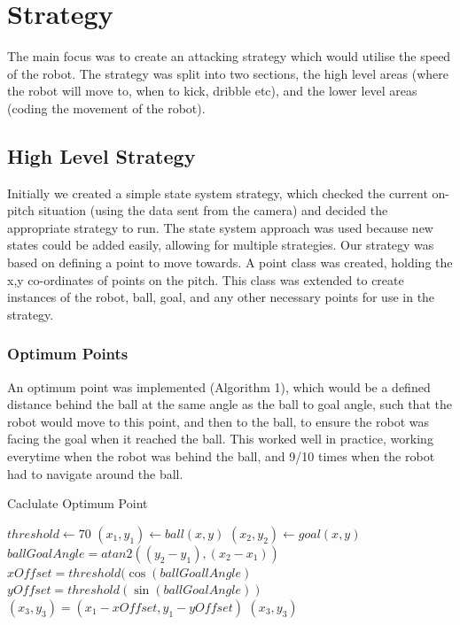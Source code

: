 \section{Strategy}

The main focus was to create an attacking strategy which would utilise the speed of the robot. The strategy was split into two sections, the high level areas (where the robot will move to, when to kick, dribble etc), and the lower level areas (coding the movement of the robot).

\subsection{High Level Strategy}
Initially we created a simple state system strategy, which checked the current on-pitch situation (using the data sent from the camera) and decided the appropriate strategy to run. The state system approach was used because new states could be added easily, allowing for multiple strategies.
Our strategy was based on defining a point to move towards. A point class was created, holding the x,y co-ordinates of points on the pitch. This class was extended to create instances of the robot, ball, goal, and any other necessary points for use in the strategy.\linebreak

\subsubsection{Optimum Points}
An optimum point was implemented (Algorithm 1), which would be a defined distance behind the ball at the same angle as the ball to goal angle, such that the robot would move to this point, and then to the ball, to ensure the robot was facing the goal when it reached the ball. This worked well in practice, working everytime when the robot was behind the ball, and 9/10 times when the robot had to navigate around the ball.\linebreak

\begin{algorithm}
\caption{Caclulate Optimum Point}
\label{optimumPoint}
\begin{algorithmic}[1]
\STATE $threshold \gets 70$
\STATE $(x_{1}, y_{1}) \gets ball (x, y)$
\STATE $(x_{2}, y_{2}) \gets goal (x, y)$
\STATE $ballGoalAngle = atan2( (y_{2} - y_{1}), (x_{2} - x_{1}) )$
\STATE $xOffset = threshold(\cos(ballGoallAngle)$
\STATE $yOffset = threshold(\sin(ballGoalAngle))$
\STATE $(x_{3}, y_{3}) = (x_{1} - xOffset, y_{1} - yOffset)$
\RETURN $(x_{3}, y_{3})$
\end{algorithmic}
\end{algorithm}

